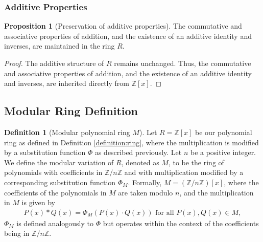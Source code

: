 \documentclass{article}
\theoremstyle{plain}
\theoremstyle{definition}
\newtheorem{definition}{Definition}
\newtheorem{proposition}{Proposition}
\newcommand{\redu}{\Phi}
\begin{document}
\subsubsection{Additive Properties}
\begin{proposition}[Preservation of additive properties] \label{proposition:ring:3}
The commutative and associative properties of addition, and the existence of an additive identity and inverses, are maintained in the ring \(R\). 
\end{proposition}
\begin{proof}
The additive structure of \(R\) remains unchanged. Thus, the commutative and associative properties of addition, and the existence of an additive identity and inverses, are inherited directly from \( \mathbb{Z}[x] \).
\end{proof}

\subsection{Modular Ring Definition}
\begin{definition}[Modular polynomial ring $M$]  \label{definition:modularring}
Let \( R = \mathbb{Z}[x] \) be our polynomial ring as defined in Definition \ref{definition:ring}, where the multiplication is modified by a substitution function \(\redu\) as described previously. Let \( n \) be a positive integer. We define the modular variation of \( R \), denoted as \( M \), to be the ring of polynomials with coefficients in \( \mathbb{Z}/n\mathbb{Z} \) and with multiplication modified by a corresponding substitution function \(\redu_M\). Formally, \( M = (\mathbb{Z}/n\mathbb{Z})[x] \), where the coefficients of the polynomials in \( M \) are taken modulo \( n \), and the multiplication in \( M \) is given by
\begin{align}
    P(x) \ast Q(x) = \redu_M(P(x) \cdot Q(x)) \text{ for all } P(x), Q(x) \in M,
\end{align}
\(\redu_M\) is defined analogously to \(\redu\) but operates within the context of the coefficients being in \( \mathbb{Z}/n\mathbb{Z} \).
\end{definition}
\end{document}
